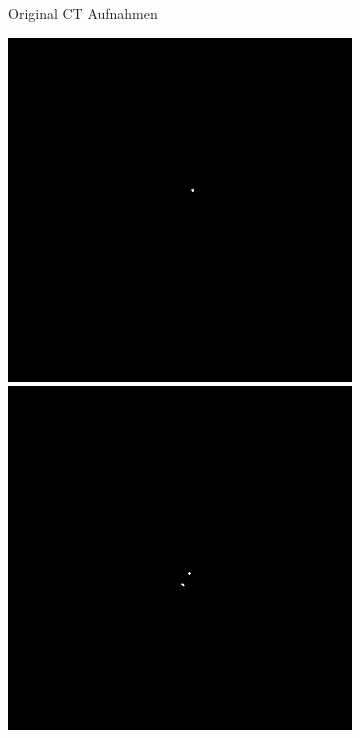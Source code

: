 \begin{figure}[H]
\begin{minipage}{0.3\textwidth}
\begin{subfigure}{\textwidth}
\caption{Original CT Aufnahmen}
\end{subfigure}
\end{minipage}%
\hspace{3mm}
\begin{minipage}{0.3\textwidth}
\begin{subfigure}{\textwidth}
\centering
\includegraphics[width=\textwidth]{Pictures/nnUnet/Praxis/Task109-CT/samples/gt/gt_CT_003-430.png}
\centering
\includegraphics[width=\textwidth]{Pictures/nnUnet/Praxis/Task109-CT/samples/gt/gt_CT_003-475.png}

\end{subfigure}
\end{minipage}
\end{figure}

